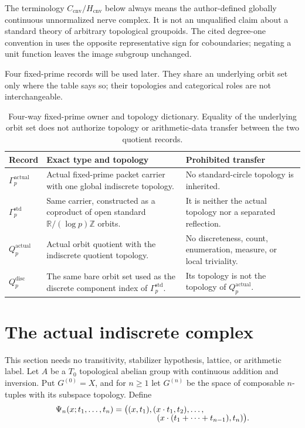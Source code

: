 \documentclass[11pt]{article}
\theoremstyle{definition}
\newcommand{\R}{\mathbb R}
\newcommand{\Z}{\mathbb Z}
\newcommand{\Gammaactual}{\Gamma_p^{\mathrm{actual}}}
\newcommand{\Gammastd}{\Gamma_p^{\mathrm{std}}}
\newcommand{\Qactual}{Q_p^{\mathrm{actual}}}
\newcommand{\Qdisc}{Q_p^{\mathrm{disc}}}
\newcommand{\Ccnv}{C_{\mathrm{cnv}}}
\newcommand{\Hcnv}{H_{\mathrm{cnv}}}
\begin{document}
The terminology $\Ccnv/\Hcnv$ below always means the author-defined globally
continuous unnormalized nerve complex.  It is not an unqualified claim
about a standard theory of arbitrary topological groupoids.  The cited
degree-one convention in \citet{FarsiHuangKumjianPacker2022} uses the
opposite representative sign for coboundaries; negating a unit function
leaves the image subgroup unchanged.

Four fixed-prime records will be used later.  They share an underlying orbit
set only where the table says so; their topologies and categorical roles are
not interchangeable.

\begin{table}[ht]
\centering
\small
\begin{tabularx}{\textwidth}{P{31mm}YY}
\toprule
Record & Exact type and topology & Prohibited transfer \\
\midrule
$\Gammaactual$ & Actual fixed-prime packet carrier with one global
indiscrete topology. & No standard-circle topology is inherited. \\
$\Gammastd$ & Same carrier, constructed as a coproduct of open standard
$\R/(\log p)\Z$ orbits. & It is neither the actual topology nor a separated
reflection. \\
$\Qactual$ & Actual orbit quotient with the indiscrete quotient topology. &
No discreteness, count, enumeration, measure, or local triviality. \\
$\Qdisc$ & The same bare orbit set used as the discrete component index of
$\Gammastd$. & Its topology is not the topology of $\Qactual$. \\
\bottomrule
\end{tabularx}
\caption{Four-way fixed-prime owner and topology dictionary.  Equality of
the underlying orbit set does not authorize topology or arithmetic-data
transfer between the two quotient records.}
\label{tab:packet-types}
\end{table}

\section{The actual indiscrete complex}
\label{sec:actual}

This section needs no transitivity, stabilizer hypothesis, lattice, or
arithmetic label.  Let $A$ be a $T_0$ topological abelian group with
continuous addition and inversion.  Put $G^{(0)}=X$, and for $n\geq1$ let
$G^{(n)}$ be the space of composable $n$-tuples with its subspace topology.
Define
\begin{align}
\label{eq:nerve-chart}
 \Psi_n(x;t_1,\ldots,t_n)
 ={}&\bigl((x,t_1),(x\mathbin{\cdot}t_1,t_2),\ldots,\\[-2mm]
 &\hspace{14mm}(x\mathbin{\cdot}(t_1+\cdots+t_{n-1}),t_n)\bigr).
\end{align}
\end{document}
